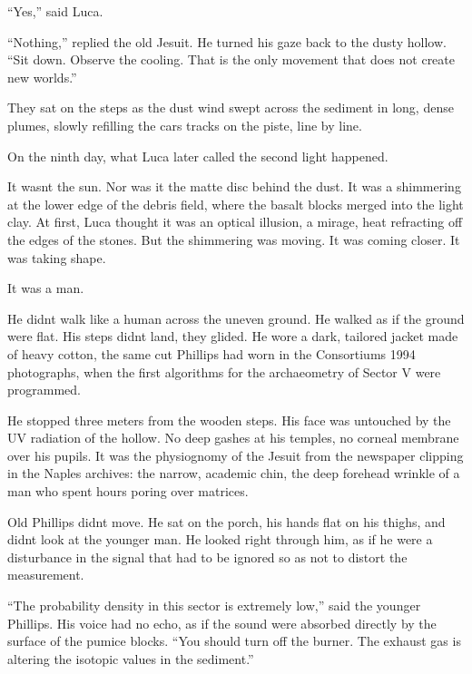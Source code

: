 \documentclass[
  ngerman,
]{article}
\begin{document}
``Yes,'' said Luca.

``Nothing,'' replied the old Jesuit. He turned his gaze back to the
dusty hollow. ``Sit down. Observe the cooling. That is the only movement
that does not create new worlds.''

They sat on the steps as the dust wind swept across the sediment in
long, dense plumes, slowly refilling the car\textquotesingle s tracks on
the piste, line by line.

On the ninth day, what Luca later called the second light happened.

It wasn\textquotesingle t the sun. Nor was it the matte disc behind the
dust. It was a shimmering at the lower edge of the debris field, where
the basalt blocks merged into the light clay. At first, Luca thought it
was an optical illusion, a mirage, heat refracting off the edges of the
stones. But the shimmering was moving. It was coming closer. It was
taking shape.

It was a man.

He didn\textquotesingle t walk like a human across the uneven ground. He
walked as if the ground were flat. His steps didn\textquotesingle t
land, they glided. He wore a dark, tailored jacket made of heavy cotton,
the same cut Phillips had worn in the Consortium\textquotesingle s 1994
photographs, when the first algorithms for the archaeometry of Sector V
were programmed.

He stopped three meters from the wooden steps. His face was untouched by
the UV radiation of the hollow. No deep gashes at his temples, no
corneal membrane over his pupils. It was the physiognomy of the Jesuit
from the newspaper clipping in the Naples archives: the narrow, academic
chin, the deep forehead wrinkle of a man who spent hours poring over
matrices.

Old Phillips didn\textquotesingle t move. He sat on the porch, his hands
flat on his thighs, and didn\textquotesingle t look at the younger man.
He looked right through him, as if he were a disturbance in the signal
that had to be ignored so as not to distort the measurement.

``The probability density in this sector is extremely low,'' said the
younger Phillips. His voice had no echo, as if the sound were absorbed
directly by the surface of the pumice blocks. ``You should turn off the
burner. The exhaust gas is altering the isotopic values
\hspace{0pt}\hspace{0pt}in the sediment.''
\end{document}
